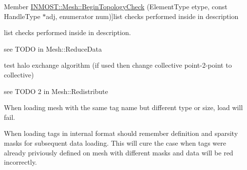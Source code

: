 \begin{DoxyRefList}
Member \hyperlink{classINMOST_1_1Mesh_a55549e9d46cd92e2f3122e1516f3c9fd}{I\-N\-M\-O\-S\-T\-:\-:Mesh\-:\-:Begin\-Topology\-Check} (Element\-Type etype, const Handle\-Type $\ast$adj, enumerator num)]list checks performed inside in description  
\item[\label{todo__todo000021}%
\hypertarget{todo__todo000021}{}%
Member \hyperlink{classINMOST_1_1Mesh_a1c6c26bcbe6e7a0cba093c0b8312ba04}{I\-N\-M\-O\-S\-T\-:\-:Mesh\-:\-:End\-Topology\-Check} (Handle\-Type e)]list checks performed inside in description.  
\item[\label{todo__todo000012}%
\hypertarget{todo__todo000012}{}%
Member \hyperlink{classINMOST_1_1Mesh_aa3e1067bc3139bb0216f7ce3c1936734}{I\-N\-M\-O\-S\-T\-:\-:Mesh\-:\-:Exchange\-Data} (const Tag \&tag, Element\-Type mask, Marker\-Type select)]see T\-O\-D\-O in Mesh\-::\-Reduce\-Data 
\item[\label{todo__todo000014}%
\hypertarget{todo__todo000014}{}%
Member \hyperlink{classINMOST_1_1Mesh_ae44b9cfcb8964acbd710562df331a51a}{I\-N\-M\-O\-S\-T\-:\-:Mesh\-:\-:Exchange\-Marked} (enum Action action=A\-Ghost)]
\begin{DoxyEnumerate}
\item test halo exchange algorithm (if used then change collective point-\/2-\/point to collective)
\item see T\-O\-D\-O 2 in Mesh\-::\-Redistribute 
\end{DoxyEnumerate}
\item[\label{todo__todo000017}%
\hypertarget{todo__todo000017}{}%
Member \hyperlink{classINMOST_1_1Mesh_a5dfd481d638b2d2d72193b4b8fa159a4}{I\-N\-M\-O\-S\-T\-:\-:Mesh\-:\-:Load} (std\-::string File)]
\begin{DoxyEnumerate}
\item When loading mesh with the same tag name but different type or size, load will fail.
\item When loading tags in internal format should remember definition and sparsity masks for subsequent data loading. This will cure the case when tags were already priviously defined on mesh with different masks and data will be red incorrectly.  
\end{DoxyEnumerate}
\item[\label{todo__todo000015}%
\hypertarget{todo__todo000015}{}%
Member \hyperlink{classINMOST_1_1Mesh_ade20ec7c8563e82bf8057bc47a3314b7}{I\-N\-M\-O\-S\-T\-:\-:Mesh\-:\-:Redistribute} ()]
\begin{DoxyEnumerate}

\end{DoxyEnumerate}
\end{DoxyRefList}
